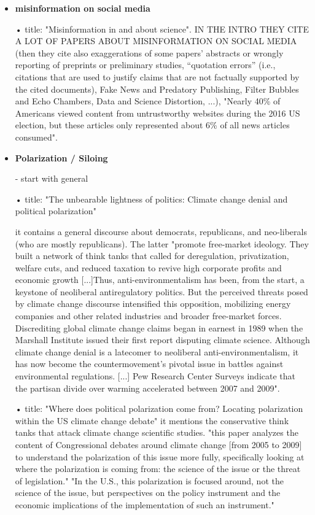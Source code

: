 \begin{itemize}
\item \textbf{misinformation on social media}\

• \cite{west2021misinformation} title: "Misinformation in and about science". IN THE INTRO THEY CITE A LOT OF PAPERS ABOUT MISINFORMATION ON SOCIAL MEDIA (then they cite also exaggerations of some papers' abstracts or wrongly reporting of preprints or preliminary studies, “quotation errors” (i.e., citations that are used to justify claims that are not factually supported by the cited documents), Fake News and Predatory Publishing, Filter Bubbles and Echo Chambers, Data and Science Distortion, ...),  "Nearly 40\% of Americans viewed content from untrustworthy websites during the 2016 US election, but these articles only represented about 6\% of all news articles consumed". 


\item \textbf{Polarization / Siloing}

- start with general

• \cite{antonio2011unbearable} title: "The unbearable lightness of politics: Climate change denial and political polarization"

it contains a general discourse about democrats, republicans, and neo-liberals (who are mostly republicans). The latter "promote free-market ideology. They built a network of think tanks that called for deregulation, privatization, welfare cuts, and reduced taxation to revive high corporate profits and economic growth [...]Thus, anti-environmentalism has been, from the start, a keystone of neoliberal antiregulatory politics. But the perceived threats posed by climate change discourse intensified this opposition, mobilizing energy companies and other related industries and broader free-market forces. Discrediting global climate change claims began in earnest in 1989 when the Marshall Institute issued their first report disputing climate
science. Although climate change denial is a latecomer to neoliberal anti-environmentalism, it has now become the countermovement’s pivotal issue in battles against environmental regulations. [...] Pew Research Center Surveys indicate that the partisan divide over warming accelerated between 2007 and 2009". 

• \cite{fisher2013does} title: "Where does political polarization come from? Locating polarization within the US climate change debate" 
it mentions the conservative think tanks that attack climate change scientific studies. "this paper analyzes the content of
Congressional debates around climate change [from 2005 to 2009] to understand the polarization of this issue more fully, specifically looking at where the polarization is coming from: the science of the issue or the threat of legislation." 
"In the U.S., this polarization is focused around, not the science of the issue, but perspectives on the policy instrument and the economic implications of the implementation of such an instrument."




\end{itemize}
